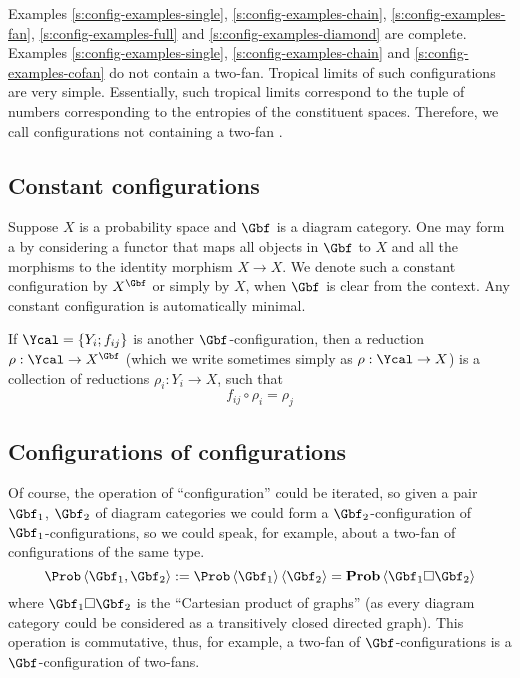   \bigskip

  Examples
  \ref{s:config-examples-single}, 
  \ref{s:config-examples-chain}, 
  \ref{s:config-examples-fan},
  \ref{s:config-examples-full} and 
  \ref{s:config-examples-diamond}
  are complete. Examples \ref{s:config-examples-single},
  \ref{s:config-examples-chain} and \ref{s:config-examples-cofan} do
  not contain a two-fan. Tropical limits of such configurations are
  very simple. Essentially, such tropical limits correspond to the
  tuple of numbers corresponding to the entropies of the constituent
  spaces. Therefore, we call configurations not containing a two-fan
  .
  
\subsection{Constant configurations}
\label{s:config-constantconfig}
  Suppose $X$ is a probability space and $\Gbf$ is a diagram category.
  One may form a  by considering a functor that maps all
  objects in $\Gbf$ to $X$ and all the morphisms to the identity
  morphism $X\to X$. We denote such a constant configuration by
  $X^{\Gbf}$ or simply by $X$, when $\Gbf$ is clear from the context.
  Any constant configuration is automatically minimal.

  If $\Ycal=\set{Y_{i};f_{ij}}$ is another $\Gbf$-configuration, then
  a reduction $\rho:\Ycal\to X^{\Gbf}$ (which we write sometimes
  simply as $\rho:\Ycal\to X$) is a collection of reductions
  $\rho_{i}:Y_{i}\to X$, such that
  \[
    f_{ij}\circ\rho_{i}=\rho_{j}
  \]
  
\subsection{Configurations of configurations}
\label{s:config-config}
  Of course, the operation of ``configuration'' could be iterated, so
  given a pair $\Gbf_{1}$, $\Gbf_{2}$ of diagram categories we could
  form a $\Gbf_{2}$-configuration of $\Gbf_{1}$-configurations, so we
  could speak, for example, about a two-fan of configurations of the same
  type.
  \[
    \Prob\<\Gbf_{1},\Gbf_{2}>
    :=
    \Prob\<\Gbf_{1}>\<\Gbf_2>
    =
    \prob\<\Gbf_{1}\square\Gbf_2>
  \]
  where $\Gbf_{1}\square\Gbf_2$ is the ``Cartesian product of
  graphs'' (as every diagram category could be considered as a
  transitively closed directed graph).  This operation is commutative,
  thus, for example, a two-fan of $\Gbf$-configurations is a
  $\Gbf$-configuration of two-fans.
  
